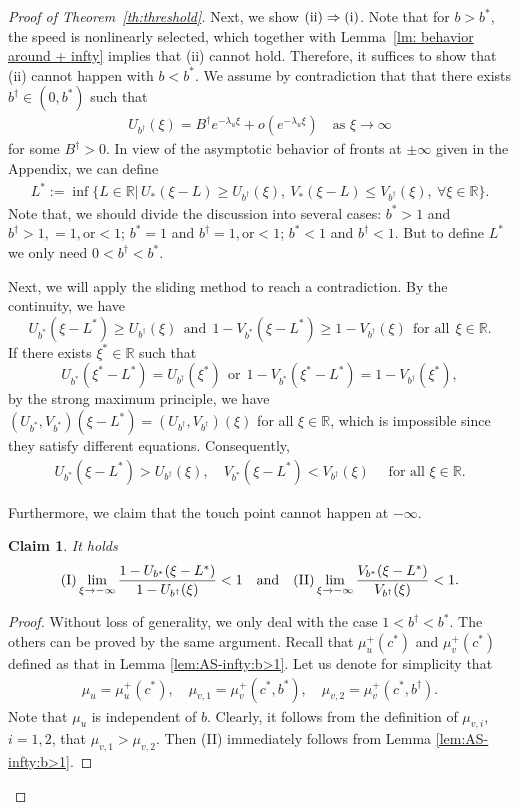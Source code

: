 \documentclass[11pt,a4paper]{article}
\newtheorem{claim}[theorem]{\textbf{Claim}}
\numberwithin{equation}{section}
\numberwithin{figure}{section}
\newcommand\bea{\begin{eqnarray}}
\newcommand\eea{\end{eqnarray}}
\newcommand\beaa{\begin{eqnarray*}}
\newcommand\eeaa{\end{eqnarray*}}
\begin{document}
\begin{proof}[Proof of Theorem~\ref{th:threshold}]
Next, we show ${\rm(ii)}\Rightarrow {\rm(i)}$. Note that for $b>b^*$, the speed is nonlinearly selected, which together with Lemma~\ref{lm: behavior around + infty} implies that (ii) cannot hold. Therefore, it suffices to show that (ii) cannot happen with
$b<b^*$. We assume by contradiction that that there exists $b^\dag\in(0,b^*)$ such that
\beaa
U_{b^\dag}(\xi)=B^\dag e^{-\lambda_u \xi}+o(e^{-\lambda_u \xi})\quad \mbox{as $\xi\to\infty$}
\eeaa
for some $B^\dag>0$.
In view of the asymptotic behavior of fronts at $\pm\infty$ given in the Appendix, we can define
\beaa
L^*:=\inf\{L\in\mathbb{R}|\, U_{*}(\xi-L)\geq U_{b^\dag}(\xi),\ V_{*}(\xi-L)\leq V_{b^\dag}(\xi),\ \forall \xi\in\mathbb{R}\}.
\eeaa
Note that,  we should divide the discussion into several cases: $b^*>1$ and $b^\dag>1,=1,\text{or}<1$; $b^*=1$ and $b^\dag=1,\text{or}<1$; $b^*<1$ and $b^\dag<1$. But to define $L^*$ we only need $0<b^\dag<b^*$.

Next, we will apply the sliding method  to reach a contradiction. By the continuity, we have 
$$U_{b^*}(\xi-L^*)\geq U_{b^\dag}(\xi)\ \ \text{and}\ \ 1-V_{b^*}(\xi-L^*)\geq 1-V_{b^\dag}(\xi)\ \ \text{for all}\ \ \xi\in\mathbb{R}.$$
 If there exists $\xi^*\in\mathbb{R}$ such that
$$U_{b^*}(\xi^*-L^*)= U_{b^\dag}(\xi^*)\ \ \text{or}\ \ 1-V_{b^*}(\xi^*-L^*)=1- V_{b^\dag}(\xi^*),$$
by the strong maximum principle, we have $(U_{b^*},V_{b^*})(\xi-L^*)= (U_{b^\dag},V_{b^\dag})(\xi)$ for all $\xi\in\mathbb{R}$,
which is impossible since they satisfy different equations. Consequently,
\bea\label{U*>U+}
U_{b^*}(\xi-L^*)> U_{b^\dag}(\xi),\quad V_{b^*}(\xi-L^*)< V_{b^\dag}(\xi)\quad \mbox{ for all $\xi\in\mathbb{R}$}.
\eea


Furthermore, we claim that the touch point cannot happen at $-\infty$.
\begin{claim}\label{claim 1 to proof th 1.5}
It holds
\beaa
\text{{\rm(I)}}\lim_{\xi\to-\infty}\frac{1-U_{b^*}(\xi-L^*)}{1-U_{b^\dag}(\xi)}<1\quad\text{and}\quad\text{{\rm(II)}}\lim_{\xi\to-\infty}\frac{V_{b^*}(\xi-L^*)}{V_{b^\dag}(\xi)}<1.
\eeaa
\end{claim}
\begin{proof}
Without loss of generality, we only deal with the case $1<b^\dag<b^*$. The others can be proved by the same argument.
Recall that $\mu^+_u(c^*)$ and $\mu^+_v(c^*)$ defined as that in Lemma \ref{lem:AS-infty:b>1}.
Let us denote for simplicity that
\beaa
\mu_u=\mu^+_u(c^*),\quad  \mu_{v,1}=\mu^+_v(c^*,b^*),\quad  \mu_{v,2}=\mu^+_v(c^*,b^\dag).
\eeaa
Note that $\mu_u$ is independent of $b$.
Clearly, it follows from the definition of $\mu_{v,i}$, $i=1,2$, that $\mu_{v,1}>\mu_{v,2}$.
Then (II) immediately follows from Lemma \ref{lem:AS-infty:b>1}.


\end{proof}
\end{proof}
\end{document}
